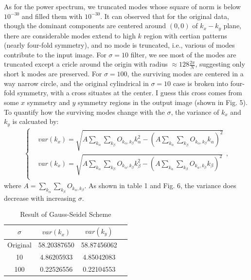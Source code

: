 \documentclass[a4paper,10pt]{article}
\begin{document}
\begin{large}
As for the power spectrum, we truncated modes whose square of norm is below $10^{-30}$ and filled them with $10^{-30}$. It can observed that for the original data, though the dominant components are centered around  $(0,0)$ of $k_x-k_y$ plane, there are considerable modes extend to high $k$ region with certian patterns (nearly four-fold symmetry), and no mode is truncated, i.e., various of modes contribute to the input image. For $\sigma=10$ filter, we see most of the modes are truncated except a cricle around the origin with radius $\approx128\frac{2\pi}{N}$, suggesting only short k modes are preserved. For $\sigma=100$, the surviving modes are centered in a way narrow circle, and the original cylindrical in $\sigma=10$ case is broken into four-fold symmetry, with a cross situates at the center. I guess this cross comes from some $x$ symmetry and $y$ symmetry regions in the output image (shown in Fig. 5). To quantify how the surviving modes change with the $\sigma$, the variance of $k_x$ and $k_y$ is calcuated by:
\begin{align*}
\begin{cases}
&var(k_x)=\sqrt{A\sum_{k_\alpha}\sum_{k_\beta}O_{k_\alpha,k_\beta}k_\alpha^2-(A\sum_{k_\alpha}\sum_{k_\beta}O_{k_\alpha,k_\beta}k_\alpha)^2} \\
&var(k_x)=\sqrt{A\sum_{k_\alpha}\sum_{k_\beta}O_{k_\alpha,k_\beta}k_\beta^2-(A\sum_{k_\alpha}\sum_{k_\beta}O_{k_\alpha,k_\beta}k_\beta)^2}\\
\end{cases},
\end{align*}
where $A=\sum_{k_\alpha}\sum_{k_\beta}O_{k_\alpha,k_\beta}$. As shown in table 1 and Fig. 6, the variance does decrease with increasing $\sigma$.

\begin{table}[h]  %
\centering  %
\begin{tabular}[t]{|c|c|c|c|}
\hline
$\sigma$ &$ var(k_x)$ & $var(k_y)$\\
\hline
Original&58.20387650&58.87456062\\
\hline
10&4.86205933&4.85042083\\
\hline
100&0.22526556&0.22104553\\
\hline

\end{tabular}
\caption{Result of Gauss-Seidel Scheme}  %
\end{table}


\end{large}
\end{document}
